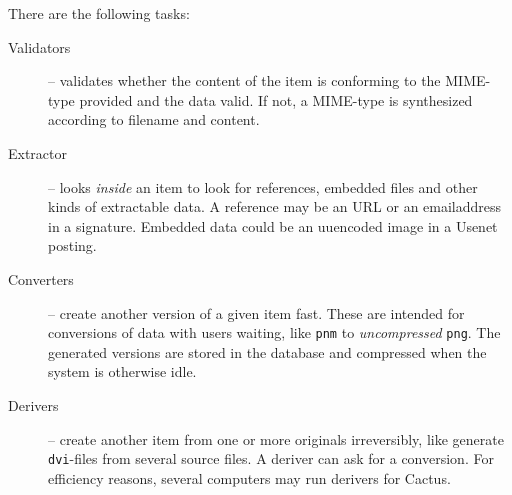 There are the following tasks:
\begin{description}
  
\item[\textsf{Validators}] -- validates whether the content of the
  item is conforming to the MIME-type provided and the data valid.  If
  not, a MIME-type is synthesized according to filename and content.

  


\item[Extractor] -- looks \textit{inside} an item to look for
references, embedded files and other kinds of extractable data.  A
reference may be an URL or an emailaddress in a signature.  Embedded
data could be an uuencoded image in a Usenet posting.

\item[Converters] -- create another version of a given item fast.  These
  are intended for conversions of data with users waiting, like
  \texttt{pnm} to \textit{uncompressed} \texttt{png}.  The generated
  versions are stored in the database and compressed when the
  system is otherwise idle. 


\item[Derivers] -- create another item from one or more originals
irreversibly, like generate \texttt{dvi}-files from several source
files.  A deriver can ask for a conversion.  For efficiency reasons,
several computers may run derivers for Cactus.



\end{description}
